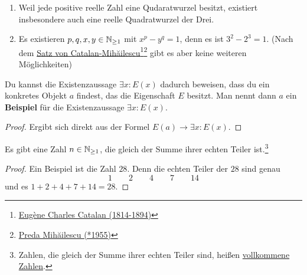  
\begin{bsp}[*] \quad
    \begin{enumerate}
        \item Weil jede positive reelle Zahl eine Qudaratwurzel besitzt, existiert insbesondere auch eine reelle Quadratwurzel der Drei.
        \item Es existieren $p,q,x,y\in \mathbb N_{\ge 1}$ mit $x^p-y^q=1$, denn es ist $3^2-2^3=1$. (Nach dem \href{https://de.wikipedia.org/wiki/Catalansche_Vermutung}{Satz von Catalan-Mihăilescu}\footnote{\href{https://de.wikipedia.org/wiki/Eug\%C3\%A8ne_Charles_Catalan}{Eugène Charles Catalan (1814-1894)}}\footnote{\href{https://de.wikipedia.org/wiki/Preda_Mih\%C4\%83ilescu}{Preda Mihăilescu (*1955)}} gibt es aber keine weiteren Möglichkeiten)
    \end{enumerate}
\end{bsp}


\begin{satz} \label{beweisperbsp} 
    Du kannst die Existenzaussage $\exists x: E(x)$ dadurch beweisen, dass du ein konkretes Objekt $a$ findest, das die Eigenschaft $E$ besitzt. Man nennt dann $a$ ein \textbf{Beispiel} für die Existenzaussage $\exists x: E(x)$.
\end{satz}
\begin{proof}
    Ergibt sich direkt aus der Formel $E(a)\to\exists x:E(x)$.
\end{proof}


\begin{bsp}
    Es gibt eine Zahl $n\in \mathbb N_{\ge 1}$, die gleich der Summe ihrer echten Teiler ist.\footnote{Zahlen, die gleich der Summe ihrer echten Teiler sind, heißen \href{https://de.wikipedia.org/wiki/Vollkommene_Zahl}{vollkommene Zahlen}.}
\end{bsp}
\begin{proof}
    Ein Beispiel ist die Zahl $28$. Denn die echten Teiler der $28$ sind genau
        \[ 1 \qquad 2 \qquad 4 \qquad 7 \qquad 14 \]
    und es $1+2+4+7+14=28$.
\end{proof}

